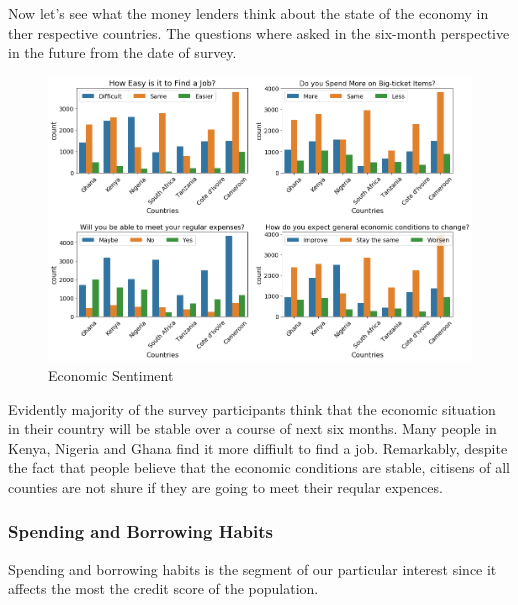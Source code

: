 Now let's see what the money lenders think about the state of the
economy in ther respective countries. The questions where asked in the
six-month perspective in the future from the date of survey.

\begin{Schunk}
\begin{figure}[H]

{\centering \includegraphics[width=1.15\linewidth]{../../artifacts/sentiment} 

}

\caption[Economic Sentiment]{Economic Sentiment}\label{fig:esent}
\end{figure}
\end{Schunk}

Evidently majority of the survey participants think that the economic
situation in their country will be stable over a course of next six
months. Many people in Kenya, Nigeria and Ghana find it more diffiult to
find a job. Remarkably, despite the fact that people believe that the
economic conditions are stable, citisens of all counties are not shure
if they are going to meet their reqular expences.

\hypertarget{spending-and-borrowing-habits}{%
\subsubsection{Spending and Borrowing
Habits}\label{spending-and-borrowing-habits}}

Spending and borrowing habits is the segment of our particular interest
since it affects the most the credit score of the population.

